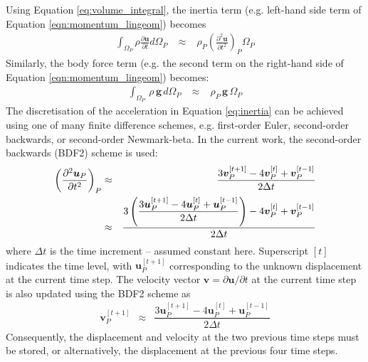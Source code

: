 \documentclass[sn-mathphys,Numbered]{sn-jnl}%
\newcommand{\bb}{\boldsymbol}
\begin{document}
Using Equation \ref{eq:volume_integral}, the inertia term (e.g. left-hand side term of Equation \ref{eqn:momentum_lingeom}) becomes
\begin{eqnarray} \label{eq:inertia}
	\int_{\Omega_P} \rho \frac{\partial \bb{u} }{\partial t}  d \Omega_P
	\;&\approx&\;
	\rho_P \left(\frac{\partial^2 \bb{u} }{\partial t^2}\right)_P  \Omega_P
\end{eqnarray}
Similarly, the body force term (e.g. the second term on the right-hand side of Equation \ref{eqn:momentum_lingeom}) becomes:
\begin{eqnarray}
	\int_{\Omega_P} \, \rho \, \bb{g} \,  d \Omega_P
	\;&\approx&\;
	\rho_P \, \bb{g}\,  \Omega_P
\end{eqnarray}
The discretisation of the acceleration in Equation \ref{eq:inertia} can be achieved using one of many finite difference schemes, e.g. first-order Euler, second-order backwards, or second-order Newmark-beta.
In the current work, the second-order backwards (BDF2) scheme is used:
\begin{eqnarray} \label{eq:inertia2}
	\left(\frac{\partial^2 \boldsymbol{u}_P}{\partial t^2}\right)_P
	&\approx& \frac{3\boldsymbol{v}_P^{[t+1]} - 4\boldsymbol{v}_P^{[t]} + \boldsymbol{v}_P^{[t-1]}}{2\Delta t} \notag \\
	&\approx&
	\frac{3\left( 
		\dfrac{3\boldsymbol{u}_P^{[t+1]} - 4\boldsymbol{u}_P^{[t]} + \boldsymbol{u}_P^{[t-1]}}{2\Delta t} 
		\right) 
	- 4\boldsymbol{v}_P^{[t]} + \boldsymbol{v}_P^{[t-1]}}{2\Delta t}
\end{eqnarray}
where $\Delta t$ is the time increment -- assumed constant here.
Superscript $[t]$ indicates the time level, with $\bb{u}_P^{[t+1]}$ corresponding to the unknown displacement at the current time step.
 The velocity vector $\bb{v} = \partial \bb{u}/\partial t$ at the current time step is also updated using the BDF2 scheme as
 \begin{eqnarray}
	\boldsymbol{v}_P^{[t+1]}	&\approx&
		\dfrac{3\boldsymbol{u}_P^{[t+1]} - 4\boldsymbol{u}_P^{[t]} + \boldsymbol{u}_P^{[t-1]}}{2\Delta t} 
\end{eqnarray}
Consequently, the displacement and velocity at the two previous time steps must be stored, or alternatively, the displacement at the previous four time steps.
\end{document}
